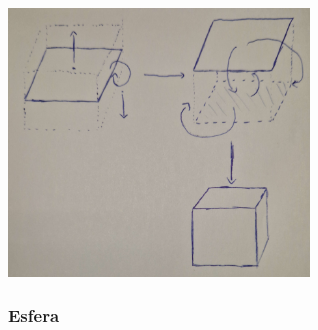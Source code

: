 \begin{center}
    \includegraphics[width=0.6\textwidth]{imgs/box.png}
    \label{fig:box}
\end{center}

\subsubsection{Esfera}